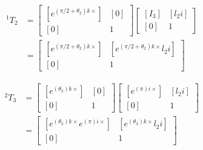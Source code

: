 \begin{solutionbox}[Q2-1]
    \begin{align*}
        {\,^1T_2} & =
        \begin{bmatrix}
            [e^{\left(\pi/2+\theta_2\right)k\times}] & [0] \\
            [0]                                      & 1
        \end{bmatrix}
        \begin{bmatrix}
            [I_3] & [l_2 i] \\
            [0]   & 1
        \end{bmatrix} \\
                  & =
        \begin{bmatrix}
            [e^{\left(\pi/2+\theta_2\right)k\times}] & [e^{\left(\pi/2+\theta_2\right)k\times} l_2 i] \\
            [0]                                      & 1
        \end{bmatrix}
    \end{align*}

    \begin{align*}
        {\,^2T_3} & =
        \begin{bmatrix}
            [e^{\left(\theta_3\right)k\times}] & [0] \\
            [0]                                & 1
        \end{bmatrix}
        \begin{bmatrix}
            [e^{\left(\pi\right)i\times}] & [l_2 i] \\
            [0]                           & 1
        \end{bmatrix} \\
                  & =
        \begin{bmatrix}
            [e^{\left(\theta_3\right)k\times} e^{\left(\pi\right)i\times}] & [e^{\left(\theta_3\right)k\times} l_2 i] \\
            [0]                                                            & 1
        \end{bmatrix}
    \end{align*}


\end{solutionbox}
